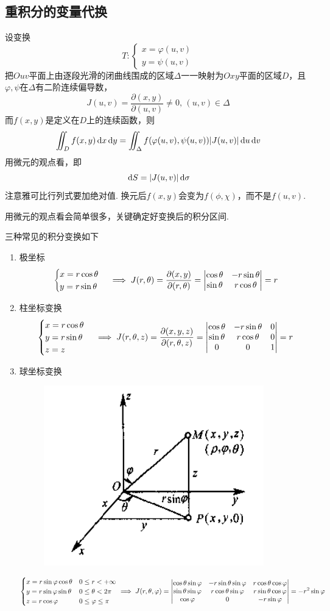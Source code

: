 \subsection{重积分的变量代换}
\begin{theorem}
设变换
\[T:\begin{cases}x=\varphi(u,v)\\y=\psi(u,v)\end{cases}\]
把$Ouv$平面上由逐段光滑的闭曲线围成的区域$\Delta$一一映射为$Oxy$平面的区域$D$，且$\varphi,\psi$在$\Delta$有二阶连续偏导数，
\[J(u,v)=\frac{\partial(x,y)}{\partial(u,v)}\ne 0,\,(u,v)\in\Delta\]
而$f(x,y)$是定义在$D$上的连续函数，则
\[\iint_Df(x,y)\,\mathrm{d} x\,\mathrm{d} y=\iint_\Delta f(\varphi(u,v),\psi(u,v))|J(u,v)|\,\mathrm{d} u\,\mathrm{d} v\]
用微元的观点看，即
\[\,\mathrm{d} S=|J(u,v)|\,\mathrm{d}\sigma\]
注意雅可比行列式要加绝对值.
换元后$f(x,y)$会变为$f(\phi,\chi)$，而不是$f(u,v)$.
\end{theorem}
用微元的观点看会简单很多，关键确定好变换后的积分区间.
\par 三种常见的积分变换如下
\begin{enumerate}
	\item 极坐标
	\[\begin{cases}x=r\cos\theta\\y=r\sin\theta\end{cases}\implies J(r,\theta)=\frac{\partial(x,y)}{\partial(r,\theta)}=\begin{vmatrix}\cos\theta & -r\sin\theta\\\sin\theta & r\cos\theta\end{vmatrix}=r\]
	\item 柱坐标变换
	\[\begin{cases}x=r\cos\theta\\y=r\sin\theta\\z=z\end{cases}\implies J(r,\theta,z)=\frac{\partial(x,y,z)}{\partial(r,\theta,z)}=\begin{vmatrix}\cos\theta & -r\sin\theta & 0\\\sin\theta & r\cos\theta & 0\\ 0 & 0 & 1\end{vmatrix}=r\]
	\item 球坐标变换
	\begin{figure}[H]
	\centering
	\includegraphics[width=0.3\linewidth]{fig/ball_coordinate.PNG}
	\end{figure}
	\[\begin{cases}x=r\sin\varphi\cos\theta&0\leq r<+\infty\\y=r\sin\varphi\sin\theta&0\leq\theta<2\pi\\z=r\cos\varphi & 0\leq\varphi\leq\pi\end{cases}\implies J(r,\theta,\varphi)=\begin{vmatrix}\cos\theta\sin\varphi & -r\sin\theta\sin\varphi & r\cos\theta\cos\varphi\\\sin\theta\sin\varphi & r\cos\theta\sin\varphi & r\sin\theta\cos\varphi\\ \cos\varphi & 0 & -r\sin\varphi\end{vmatrix}=-r^2\sin\varphi\]
\end{enumerate}
